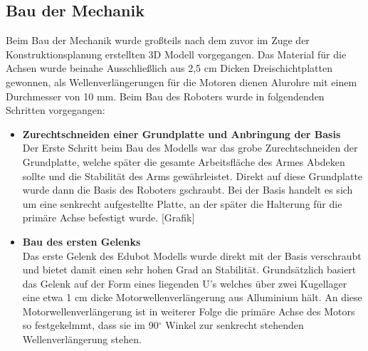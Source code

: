 \subsection{Bau der Mechanik}
Beim Bau der Mechanik wurde großteils nach dem zuvor im Zuge der Konstruktionsplanung erstellten 3D Modell vorgegangen. Das Material für die Achsen wurde beinahe Ausschließlich aus 2,5 cm Dicken Dreischichtplatten gewonnen, als Wellenverlängerungen für die Motoren dienen Alurohre mit einem Durchmesser von 10 mm. 
Beim Bau des Roboters wurde in folgendenden Schritten vorgegangen:
\begin{itemize}
\item \textbf{Zurechtschneiden einer Grundplatte und Anbringung der Basis}\\
Der Erste Schritt beim Bau des Modells war das grobe Zurechtschneiden der Grundplatte, welche später die gesamte Arbeitsfläche des Armes Abdeken sollte und die Stabilität des Arms gewährleistet.
Direkt auf diese Grundplatte wurde dann die Basis des Roboters gschraubt. Bei der Basis handelt es sich um eine senkrecht aufgestellte Platte, an der später die Halterung für die primäre Achse befestigt wurde.
[Grafik]
\item \textbf{Bau des ersten Gelenks}\\
Das erste Gelenk des  Edubot Modells wurde direkt mit der Basis verschraubt und bietet damit einen sehr hohen Grad an Stabilität. Grundsätzlich basiert das Gelenk auf der Form eines liegenden U's welches über zwei Kugellager eine etwa 1 cm dicke Motorwellenverlängerung aus Alluminium hält. An diese Motorwellenverlängerung ist in weiterer Folge die primäre Achse des Motors so festgekelmmt, dass sie im 90$^\circ$ Winkel zur senkrecht stehenden Wellenverlängerung stehen.


\end{itemize}
